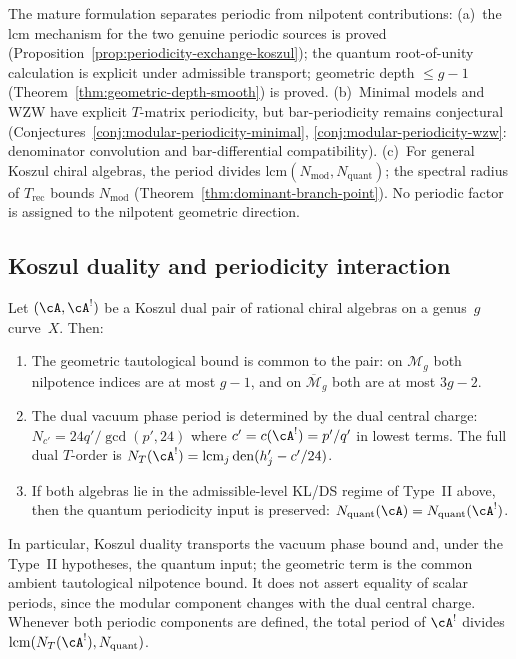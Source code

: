 \begin{remark}\label{rem:stratified-periodicity}
The mature formulation separates periodic from nilpotent contributions:
(a)~the lcm mechanism for the two genuine periodic sources is proved
(Proposition~\ref{prop:periodicity-exchange-koszul}); the quantum
root-of-unity calculation is explicit under admissible transport;
geometric depth $\leq g-1$
(Theorem~\ref{thm:geometric-depth-smooth}) is proved.
(b)~Minimal models and WZW have explicit $T$-matrix periodicity,
but bar-periodicity remains conjectural
(Conjectures~\ref{conj:modular-periodicity-minimal},
\ref{conj:modular-periodicity-wzw}: denominator convolution and
bar-differential compatibility).
(c)~For general Koszul chiral algebras, the period divides
$\mathrm{lcm}(N_{\mathrm{mod}}, N_{\mathrm{quant}})$; the spectral
radius of $T_{\mathrm{rec}}$ bounds $N_{\mathrm{mod}}$
(Theorem~\ref{thm:dominant-branch-point}).
No periodic factor is assigned to the nilpotent geometric direction.
\end{remark}

\subsection{Koszul duality and periodicity interaction}

\begin{proposition}
\label{prop:periodicity-exchange-koszul}
Let $(\cA, \cA^!)$ be a Koszul dual pair of rational chiral algebras on a genus~$g$ curve~$X$. Then:
\begin{enumerate}
\item The geometric tautological bound is common to the pair:
 on $\mathcal M_g$ both nilpotence indices are at most $g-1$, and on
 $\overline{\mathcal M}_g$ both are at most $3g-2$.
\item The dual vacuum phase period is determined by the dual central
 charge:
 $N_{c'} = 24q'/\gcd(p', 24)$ where
 $c' = c(\cA^!) = p'/q'$ in lowest terms. The full dual
 $T$-order is
 $N_T(\cA^!)=\operatorname{lcm}_j\operatorname{den}(h'_j-c'/24)$.
\item If both algebras lie in the admissible-level KL/DS regime of
 Type~II above, then the quantum periodicity input is preserved:
 $N_{\text{quant}}(\cA) = N_{\text{quant}}(\cA^!)$.
\end{enumerate}
In particular, Koszul duality transports the vacuum phase bound and,
under the Type~II hypotheses, the quantum input; the geometric term is
the common ambient tautological nilpotence bound. It does not assert
equality of scalar periods, since the modular component changes with
the dual central charge. Whenever both periodic components are defined,
the total period of $\cA^!$ divides
$\mathrm{lcm}(N_T(\cA^!), N_{\text{quant}})$.
\end{proposition}

